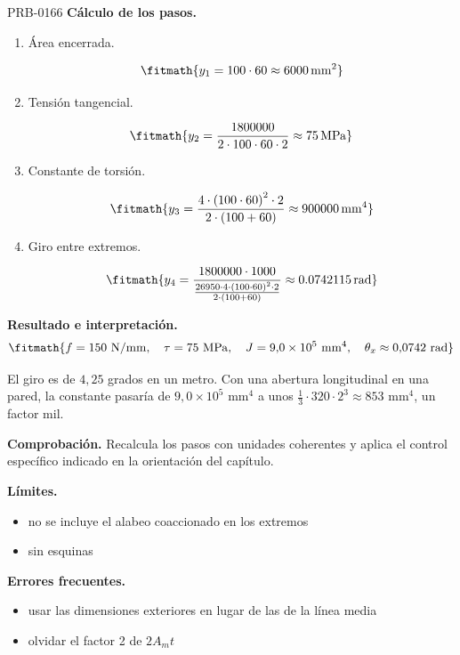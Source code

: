 \begin{studiumworked}{PRB-0166}
\textbf{Cálculo de los pasos.}

\begin{enumerate}

\item Área encerrada.

\[\fitmath{y_{1}=100\cdot 60\approx 6000\,\mathrm{mm^{2}}}\]

\item Tensión tangencial.

\[\fitmath{y_{2}=\frac{1800000}{2\cdot 100\cdot 60\cdot 2}\approx 75\,\mathrm{MPa}}\]

\item Constante de torsión.

\[\fitmath{y_{3}=\frac{4\cdot {\left(100\cdot 60\right)}^{2}\cdot 2}{2\cdot \left(100+60\right)}\approx 900000\,\mathrm{mm^{4}}}\]

\item Giro entre extremos.

\[\fitmath{y_{4}=\frac{1800000\cdot 1000}{\frac{26950\cdot 4\cdot {\left(100\cdot 60\right)}^{2}\cdot 2}{2\cdot \left(100+60\right)}}\approx 0.0742115\,\mathrm{rad}}\]

\end{enumerate}

\textbf{Resultado e interpretación.}\[\fitmath{f = 150\ \mathrm{N/mm},\quad \tau = 75\ \mathrm{MPa},\quad J = 9{,}0\times 10^{5}\ \mathrm{mm}^{4},\quad \theta_x \approx 0{,}0742\ \mathrm{rad}}\]

El giro es de $4{,}25$ grados en un metro. Con una abertura longitudinal en una pared, la constante pasaría de $9{,}0\times 10^5$ mm$^4$ a unos $\tfrac{1}{3} \cdot 320 \cdot 2^3 \approx 853$ mm$^4$, un factor mil.

\par\textbf{Comprobación.} Recalcula los pasos con unidades coherentes y aplica el control específico indicado en la orientación del capítulo.

\textbf{Límites.}\begin{itemize}\item no se incluye el alabeo coaccionado en los extremos
\item sin esquinas\end{itemize}

\textbf{Errores frecuentes.}\begin{itemize}\item usar las dimensiones exteriores en lugar de las de la línea media
\item olvidar el factor 2 de $2 A_m t$\end{itemize}

\end{studiumworked}

